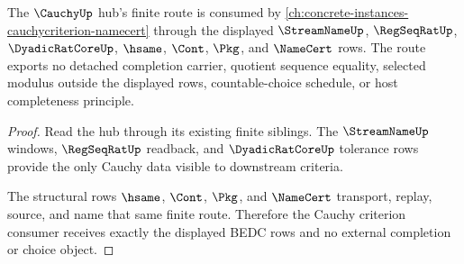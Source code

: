 \begin{theorem}
\label{thm:cauchy-orphan-route-to-cauchy-criterion}
The $\CauchyUp$ hub's finite route is consumed by \autoref{ch:concrete-instances-cauchycriterion-namecert} through the displayed $\StreamNameUp$, $\RegSeqRatUp$, $\DyadicRatCoreUp$, $\hsame$, $\Cont$, $\Pkg$, and $\NameCert$ rows. The route exports no detached completion carrier, quotient sequence equality, selected modulus outside the displayed rows, countable-choice schedule, or host completeness principle.
\end{theorem}
\begin{proof}
Read the hub through its existing finite siblings. The $\StreamNameUp$ windows, $\RegSeqRatUp$ readback, and $\DyadicRatCoreUp$ tolerance rows provide the only Cauchy data visible to downstream criteria.

The structural rows $\hsame$, $\Cont$, $\Pkg$, and $\NameCert$ transport, replay, source, and name that same finite route. Therefore the Cauchy criterion consumer receives exactly the displayed BEDC rows and no external completion or choice object.
\end{proof}
